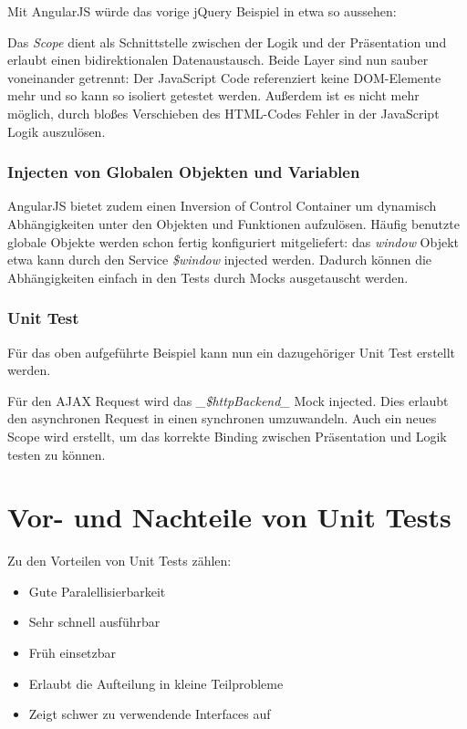 \documentclass[a4paper,bibtotoc,oneside]{scrbook}
\begin{document}
Mit AngularJS würde das vorige jQuery Beispiel in etwa so aussehen:




Das \emph{Scope} dient als Schnittstelle zwischen der Logik und der Präsentation und erlaubt einen bidirektionalen Datenaustausch. Beide Layer sind nun sauber voneinander getrennt: Der JavaScript Code referenziert keine DOM-Elemente mehr und so kann so isoliert getestet werden. Außerdem ist es nicht mehr möglich, durch bloßes Verschieben des HTML-Codes Fehler in der JavaScript Logik auszulösen.


\subsubsection{Injecten von Globalen Objekten und Variablen}
AngularJS bietet zudem einen Inversion of Control Container um dynamisch Abhängigkeiten unter den Objekten und Funktionen aufzulösen. Häufig benutzte globale Objekte werden schon fertig konfiguriert mitgeliefert: das \emph{window} Objekt etwa kann durch den Service \emph{\$window} injected werden. Dadurch können die Abhängigkeiten einfach in den Tests durch Mocks ausgetauscht werden.

\subsubsection{Unit Test}
Für das oben aufgeführte Beispiel kann nun ein dazugehöriger Unit Test erstellt werden.

Für den AJAX Request wird das \emph{\_\$httpBackend\_} Mock injected. Dies erlaubt den asynchronen Request in einen synchronen umzuwandeln. Auch ein neues Scope wird erstellt, um das korrekte Binding zwischen Präsentation und Logik testen zu können.



\section{Vor- und Nachteile von Unit Tests}

Zu den Vorteilen von Unit Tests zählen:

\begin{itemize}
  \item Gute Paralellisierbarkeit
  \item Sehr schnell ausführbar
  \item Früh einsetzbar
  \item Erlaubt die Aufteilung in kleine Teilprobleme
  \item Zeigt schwer zu verwendende Interfaces auf
\end{itemize}
\end{document}
